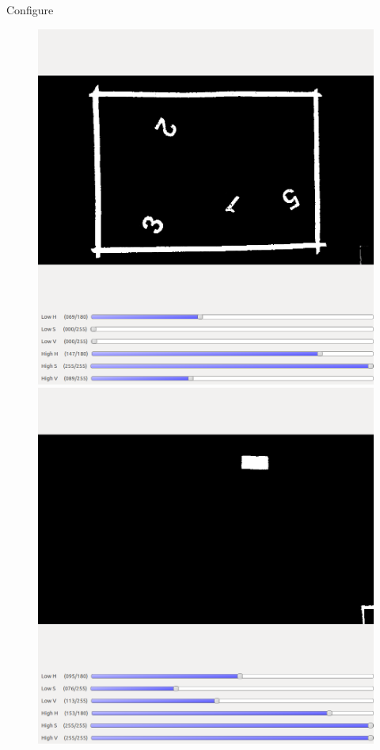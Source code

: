 \begin{frame}[fragile]{Configure}
\begin{figure}[H]
	\begin{minipage}{0.48\linewidth}
		\includegraphics[width=\linewidth]{Immagini/filterBlack}
	\end{minipage}
	\vspace{0.04\linewidth}
	\begin{minipage}{0.48\linewidth}
		\includegraphics[width=\linewidth]{Immagini/filterBlue}
	\end{minipage}
\end{figure}
\end{frame}

